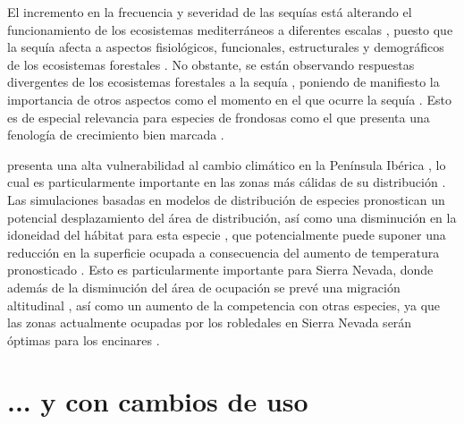El incremento en la frecuencia y severidad de las sequías está alterando el funcionamiento de los ecosistemas mediterráneos a diferentes escalas \autocites{Penuelasetal2017ImpactsGlobal,Forneretal2018ExtremeDroughts,Liuetal2020EffectsDecadal,OgayaPenuelas2021ClimateChange}, puesto que la sequía afecta a aspectos fisiológicos, funcionales, estructurales y demográficos de los ecosistemas forestales \autocites{Allenetal2010GlobalOverview, Assaletal2016SpatialTemporal}. No obstante, se están observando respuestas divergentes de los ecosistemas forestales a la sequía \autocites{Andereggetal2020DivergentForest}, poniendo de manifiesto la importancia de otros aspectos como el momento en el que ocurre la sequía \autocites{Huangetal2018DroughtTiming}. Esto es de especial relevancia para especies de frondosas como el \Qpy que presenta una fenología de crecimiento bien marcada \autocites{PerezdeLisetal2016ChangesSpring}. 

\Qp presenta una alta vulnerabilidad al cambio climático en la Península Ibérica \autocites{GarciaValdesetal2013ChasingMoving,BenitoGarzonetal2008EffectsClimate,Benitoetal2011SimulatingPotential}, lo cual es particularmente importante en las zonas más cálidas de su distribución \autocites{GeaIzquierdoCanellas2014LocalClimate}. Las simulaciones basadas en modelos de distribución de especies pronostican un potencial desplazamiento del área de distribución, así como una disminución en la idoneidad del hábitat para esta especie \autocites{Mateoetal2010EffectsNumber,BenitoGarzonetal2008EffectsClimate,Felicisimo2011ImpactosVulnerabilidad,Felicisimoetal2012VulnerabilidadFlora,RuizLabourdetteetal2011ForestComposition,Urbietaetal2011MediterraneanPine,Benitoetal2011SimulatingPotential}, que potencialmente puede suponer una reducción en la superficie ocupada a consecuencia del aumento de temperatura pronosticado \autocites{BenitoGarzonetal2008EffectsClimate,Benitoetal2011SimulatingPotential}. Esto es particularmente importante para Sierra Nevada, donde además de la disminución del área de ocupación se prevé una migración altitudinal \autocites{Benitoetal2011SimulatingPotential,Benito2009EcoinformaticaAplicada}, así como un aumento de la competencia con otras especies, ya que las zonas actualmente ocupadas por los robledales en Sierra Nevada serán óptimas para los encinares \autocites{Benitoetal2011SimulatingPotential}.

\section{... y con cambios de uso}\label{sec:intro:land-use}


